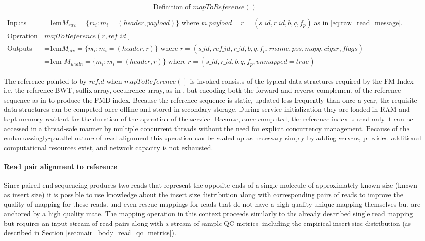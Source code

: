 \bgroup
\def\arraystretch{1.5}
\begin{table}[!ht]
    \caption{Definition of $mapToReference()$}
    \label{tab:op_map_read_to_reference}
    {\begin{tabular}{l|p{12cm}}
    \toprule
    Inputs & \hangindent=1em$M_{raw} = \{m_i: m_i = (header, payload)\}$ where $m.payload = r = (s\_id, r\_id, b, q, f_p)$ as in \ref{eq:raw_read_message}. \\
    \cline{2-2}
    Operation & $mapToReference(r, ref\_id)$\\
    \cline{2-2}
    \multirow{2}{*}{Outputs} & \hangindent=1em$M_{aln} = \{m_i: m_i = (header, r)\} \text{ where } r = (s\_id, ref\_id, r\_id, b, q, f_p, rname, pos, mapq, cigar, flags)$\\
    & \hangindent=1em $M_{unaln} = \{m_i: m_i = (header, r)\} \text{  where } r = (s\_id, r\_id, b, q, f_p, unmapped=true)$\\
    \bottomrule
    \end{tabular}}
\end{table}
\egroup

The reference pointed to by $ref_id$ when $mapToReference()$ is invoked consists of the typical data structures required by the FM Index i.e. the reference BWT, suffix array, occurrence array, as in \autocite{ferragina2000opportunistic}, but encoding both the forward and reverse complement of the reference sequence as in \autocite{Li2013} to produce the FMD index. Because the reference sequence is static, updated less frequently than once a year, the requisite data structures can be computed once offline and stored in secondary storage. During service initialization they are loaded in RAM and kept memory-resident for the duration of the operation of the service. Because, once computed, the reference index is read-only it can be accessed in a thread-safe manner by multiple concurrent threads without the need for explicit concurrency management. Because of the embarrassingly-parallel nature of read alignment this operation can be scaled up as necessary simply by adding servers, provided additional computational resources exist, and network capacity is not exhausted.

\paragraph{Read pair alignment to reference} 
Since paired-end sequencing produces two reads that represent the opposite ends of a single molecule of approximately known size (known as insert size) it is possible to use knowledge about the insert size distribution along with corresponding pairs of reads to improve the quality of mapping for these reads, and even rescue mappings for reads that do not have a high quality unique mapping themselves but are anchored by a high quality mate. The mapping operation in this context proceeds similarly to the already described single read mapping but requires an input stream of read pairs along with a stream of sample QC metrics, including the empirical insert size distribution (as described in Section \ref{sec:main_body_read_qc_metrics}).

